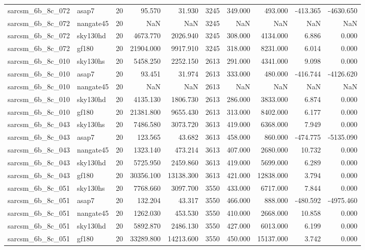 \documentclass{article}
\begin{document}
\begin{longtable}{llrrrrrrrr}
sarcsm\_6b\_8c\_072 & asap7 & 20 & 95.570 & 31.930 & 3245 & 349.000 & 493.000 & -413.365 & -4630.650 \\
sarcsm\_6b\_8c\_072 & nangate45 & 20 & NaN & NaN & 3245 & NaN & NaN & NaN & NaN \\
sarcsm\_6b\_8c\_072 & sky130hd & 20 & 4673.770 & 2026.940 & 3245 & 308.000 & 4134.000 & 6.886 & 0.000 \\
sarcsm\_6b\_8c\_072 & gf180 & 20 & 21904.000 & 9917.910 & 3245 & 318.000 & 8231.000 & 6.014 & 0.000 \\
sarcsm\_6b\_8c\_010 & sky130hs & 20 & 5458.250 & 2252.150 & 2613 & 291.000 & 4341.000 & 9.098 & 0.000 \\
sarcsm\_6b\_8c\_010 & asap7 & 20 & 93.451 & 31.974 & 2613 & 333.000 & 480.000 & -416.744 & -4126.620 \\
sarcsm\_6b\_8c\_010 & nangate45 & 20 & NaN & NaN & 2613 & NaN & NaN & NaN & NaN \\
sarcsm\_6b\_8c\_010 & sky130hd & 20 & 4135.130 & 1806.730 & 2613 & 286.000 & 3833.000 & 6.874 & 0.000 \\
sarcsm\_6b\_8c\_010 & gf180 & 20 & 21381.800 & 9655.430 & 2613 & 313.000 & 8402.000 & 6.177 & 0.000 \\
sarcsm\_6b\_8c\_043 & sky130hs & 20 & 7486.580 & 3073.720 & 3613 & 419.000 & 6368.000 & 7.949 & 0.000 \\
sarcsm\_6b\_8c\_043 & asap7 & 20 & 123.565 & 43.682 & 3613 & 458.000 & 860.000 & -474.775 & -5135.090 \\
sarcsm\_6b\_8c\_043 & nangate45 & 20 & 1323.140 & 473.214 & 3613 & 407.000 & 2680.000 & 10.732 & 0.000 \\
sarcsm\_6b\_8c\_043 & sky130hd & 20 & 5725.950 & 2459.860 & 3613 & 419.000 & 5699.000 & 6.289 & 0.000 \\
sarcsm\_6b\_8c\_043 & gf180 & 20 & 30356.100 & 13138.300 & 3613 & 421.000 & 12838.000 & 3.794 & 0.000 \\
sarcsm\_6b\_8c\_051 & sky130hs & 20 & 7768.660 & 3097.700 & 3550 & 433.000 & 6717.000 & 7.844 & 0.000 \\
sarcsm\_6b\_8c\_051 & asap7 & 20 & 132.204 & 43.317 & 3550 & 466.000 & 888.000 & -480.592 & -4975.460 \\
sarcsm\_6b\_8c\_051 & nangate45 & 20 & 1262.030 & 453.530 & 3550 & 410.000 & 2668.000 & 10.858 & 0.000 \\
sarcsm\_6b\_8c\_051 & sky130hd & 20 & 5892.870 & 2486.130 & 3550 & 427.000 & 6013.000 & 6.199 & 0.000 \\
sarcsm\_6b\_8c\_051 & gf180 & 20 & 33289.800 & 14213.600 & 3550 & 450.000 & 15137.000 & 3.742 & 0.000 \\

\end{longtable}
\end{document}
